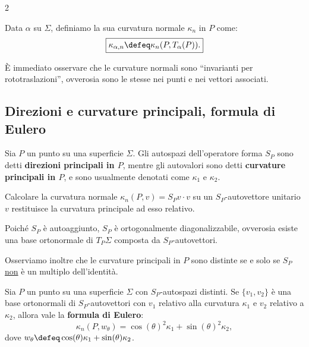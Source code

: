 \begin{multicols*}{2}
\begin{definition}
        Data $\alpha$ su $\Sigma$, definiamo la sua curvatura normale $\kappa_n$ in $P$
        come:
        \[
            \boxed{\kappa_{\alpha, n} \defeq \kappa_n(P, T_\alpha(P)).}
        \]
    \end{definition}

    \begin{remark}
        È immediato osservare che le curvature normali sono ``invarianti per rototraslazioni'',
        ovverosia sono le stesse nei punti e nei vettori associati.
    \end{remark}

    \subsection{Direzioni e curvature principali, formula di Eulero}

    \begin{definition}
        Sia $P$ un punto su una superficie $\Sigma$. Gli autospazi
        dell'operatore forma $S_P$ sono detti \textbf{direzioni principali in $P$},
        mentre gli autovalori sono detti \textbf{curvature principali in $P$}, e sono
        usualmente denotati come $\kappa_1$ e $\kappa_2$.
    \end{definition}

    \begin{remark}
        Calcolare la curvatura normale $\kappa_n(P, v) = S_P v \cdot v$ su un $S_P$-autovettore unitario $v$ restituisce la
        curvatura principale ad esso relativo.
    \end{remark}

    \begin{remark}
        Poiché $S_P$ è autoaggiunto, $S_P$ è ortogonalmente diagonalizzabile,
        ovverosia esiste una base ortonormale di $T_P \Sigma$ composta da
        $S_P$-autovettori. \smallskip

        Osserviamo inoltre che le curvature principali in
        $P$ sono distinte se e solo se $S_P$ \underline{non} è un multiplo
        dell'identità.
    \end{remark}

    \begin{proposition}
        Sia $P$ un punto su una superficie $\Sigma$ con $S_P$-autospazi
        distinti. Se $\{v_1, v_2\}$ è una base ortonormali di $S_P$-autovettori con
        $v_1$ relativo alla curvatura $\kappa_1$ e $v_2$ relativo a $\kappa_2$, allora
        vale la \textbf{formula di Eulero}:
        \begin{equation} \label{eq:eulero} \tag{Eulero}
            \kappa_n(P, w_\theta) = \cos(\theta)^2 \kappa_1 + \sin(\theta)^2 \kappa_2,
        \end{equation}
        dove $w_\theta \defeq \cos(\theta) \kappa_1 + \sin(\theta) \kappa_2$.
    \end{proposition}


\end{multicols*}
